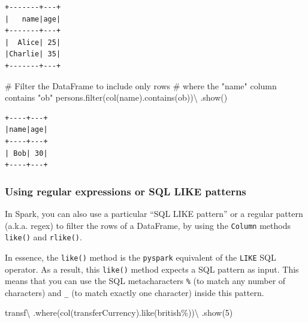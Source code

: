 \documentclass[
  11pt,
  letterpaper,
  DIV=11,
  numbers=noendperiod]{scrreprt}
\newenvironment{Shaded}{\begin{snugshade}}{\end{snugshade}}
\newcommand{\BuiltInTok}[1]{\textcolor[rgb]{0.00,0.23,0.31}{#1}}
\newcommand{\CommentTok}[1]{\textcolor[rgb]{0.37,0.37,0.37}{#1}}
\newcommand{\DecValTok}[1]{\textcolor[rgb]{0.68,0.00,0.00}{#1}}
\newcommand{\NormalTok}[1]{\textcolor[rgb]{0.00,0.23,0.31}{#1}}
\newcommand{\OperatorTok}[1]{\textcolor[rgb]{0.37,0.37,0.37}{#1}}
\newcommand{\StringTok}[1]{\textcolor[rgb]{0.13,0.47,0.30}{#1}}
\begin{document}
\begin{verbatim}
+-------+---+
|   name|age|
+-------+---+
|  Alice| 25|
|Charlie| 35|
+-------+---+
\end{verbatim}

\begin{Shaded}
\begin{Highlighting}[]
\CommentTok{\# Filter the DataFrame to include only rows}
\CommentTok{\# where the "name" column contains "ob"}
\NormalTok{persons.}\BuiltInTok{filter}\NormalTok{(col(}\StringTok{\textquotesingle{}name\textquotesingle{}}\NormalTok{).contains(}\StringTok{\textquotesingle{}ob\textquotesingle{}}\NormalTok{))}\OperatorTok{\textbackslash{}}
\NormalTok{  .show()}
\end{Highlighting}
\end{Shaded}

\begin{verbatim}
+----+---+
|name|age|
+----+---+
| Bob| 30|
+----+---+
\end{verbatim}

\subsubsection{Using regular expressions or SQL LIKE
patterns}\label{sec-filter-regex-pattern}

In Spark, you can also use a particular ``SQL LIKE pattern'' or a
regular pattern (a.k.a. regex) to filter the rows of a DataFrame, by
using the \texttt{Column} methods \texttt{like()} and \texttt{rlike()}.

In essence, the \texttt{like()} method is the \texttt{pyspark}
equivalent of the \texttt{LIKE} SQL operator. As a result, this
\texttt{like()} method expects a SQL pattern as input. This means that
you can use the SQL metacharacters \texttt{\%} (to match any number of
characters) and \texttt{\_} (to match exactly one character) inside this
pattern.

\begin{Shaded}
\begin{Highlighting}[]
\NormalTok{transf}\OperatorTok{\textbackslash{}}
\NormalTok{  .where(col(}\StringTok{\textquotesingle{}transferCurrency\textquotesingle{}}\NormalTok{).like(}\StringTok{\textquotesingle{}british\%\textquotesingle{}}\NormalTok{))}\OperatorTok{\textbackslash{}}
\NormalTok{  .show(}\DecValTok{5}\NormalTok{)}
\end{Highlighting}
\end{Shaded}
\end{document}
